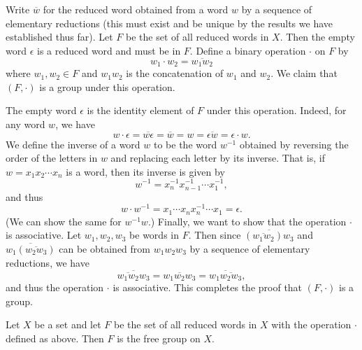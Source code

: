 Write \(\overline{w}\) for the reduced word obtained from a word \(w\) by a
sequence of elementary reductions (this must exist and be unique by the results
we have established thus far). Let \(F\) be the set of all reduced words in
\(X\). Then the empty word \(\epsilon\) is a reduced word and must be in \(F\).
Define a binary operation \(\cdot\) on \(F\) by
\[
    w_1 \cdot w_2 = \overline{w_1 w_2}
\]
where \(w_1, w_2 \in F\) and \(w_1 w_2\) is the concatenation of \(w_1\) and
\(w_2\). We claim that \((F, \cdot)\) is a group under this operation.

The empty word \(\epsilon\) is the identity element of \(F\) under this
operation. Indeed, for any word \(w\), we have
\[
    w \cdot \epsilon = \overline{w \epsilon} = \overline{w} = w = \overline{\epsilon w} = \epsilon \cdot w.
\]
We define the inverse of a word \(w\) to be the word \(w^{-1}\) obtained by
reversing the order of the letters in \(w\) and replacing each letter by its
inverse. That is, if \(w = x_1 x_2 \cdots x_n\) is a word, then its inverse is
given by
\[
    w^{-1} = x_n^{-1} x_{n - 1}^{-1} \cdots x_1^{-1},
\]
and thus
\[
    w \cdot w^{-1} = x_1 \cdots x_n x_n^{-1} \cdots x_1 = \epsilon.
\]
(We can show the same for \(w^{-1}w\).) Finally, we want to show that the
operation \(\cdot\) is associative. Let \(w_1, w_2, w_3\) be words in \(F\).
Then since \(\overline{(\overline{w_1 w_2})w_3}\) and
\(\overline{w_1(\overline{w_2 w_3})}\) can be obtained from \(w_1 w_2 w_3\) by a
sequence of elementary reductions, we have
\[
    \overline{\overline{w_1 w_2} w_3} = \overline{w_1 w_2 w_3} = \overline{w_1 \overline{w_2 w_3}},
\]
and thus the operation \(\cdot\) is associative. This completes the proof that
\((F, \cdot)\) is a group.

\begin{theorem}
    Let \(X\) be a set and let \(F\) be the set of all reduced words in \(X\)
    with the operation \(\cdot\) defined as above. Then \(F\) is the free group
    on \(X\). 
\end{theorem}

